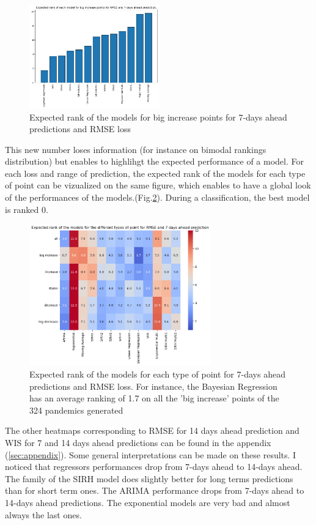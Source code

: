 \begin{figure}[h!]
    \centering
    \includegraphics[width=0.5\textwidth]{figures/expected_ranks_big_increase_RMSE_7.png}
    \caption{Expected rank of the models for big increase points for 7-days ahead predictions and RMSE loss}
    \label{fig:expected_rank}
\end{figure}

This new number loses information (for instance on bimodal rankings distribution) but enables to highlihgt the expected performance of a model. 
For each loss and range of prediction, the expected rank of the models for each type of point can be vizualized on the same figure, which enables to have a global look of the performances of the models.(Fig.\ref{fig:heatmap_RMSE_7}). During a classification, the best model is ranked 0. 
\begin{figure}[h!]
    \centering
    \includegraphics[width=0.7\textwidth]{figures/heatmap_RMSE_7.png}
    \caption{Expected rank of the models for each type of point for 7-days ahead predictions and RMSE loss. For instance, the Bayesian Regression has an average ranking of 1.7 on all the 'big increase' points of the 324 pandemics generated }
    \label{fig:heatmap_RMSE_7}
\end{figure}


The other heatmaps corresponding to RMSE for 14 days ahead prediction and WIS for 7 and 14 days ahead predictions can be found in the appendix (\ref{sec:appendix}).
Some general interpretations can be made on these results. 
I noticed that regressors performances drop from 7-days ahead to 14-days ahead. 
The family of the SIRH model does slightly better for long terms predictions than for short term ones. 
The ARIMA performance drops from 7-days ahead to 14-days ahead predictions. 
The exponential models are very bad and almost always the last ones. 

